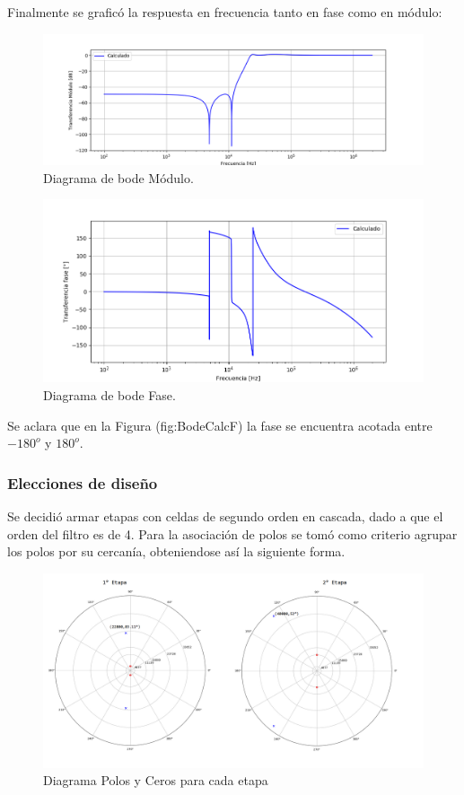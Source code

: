 Finalmente se graficó la respuesta en frecuencia tanto en fase como en módulo:
\begin{figure}[H]
	\centering
	\includegraphics[width=\textwidth]{Imagenes-Ej3/BodeCalc.png}
	\caption{Diagrama de bode Módulo.}
	\label{fig:Bodecalc}
\end{figure}
\begin{figure}[H]
	\centering
	\includegraphics[width=\textwidth]{Imagenes-Ej3/BodeFaseCalc.png}
	\caption{Diagrama de bode Fase.}
	\label{fig:BodeCalcF}
\end{figure}
Se aclara que en la Figura ({fig:BodeCalcF}) la fase se encuentra acotada entre $-180 ^o$ y $180 ^o$. 

\subsubsection{Elecciones de diseño}
Se decidió armar etapas con celdas de segundo orden en cascada, dado a que el orden del filtro es de 4. Para la asociación de polos se tomó como criterio agrupar los polos por su cercanía, obteniendose así la siguiente forma.
\begin{figure}[H]
	\centering
	\includegraphics[width=\textwidth]{Imagenes-Ej3/UnionCeros.png}
	\caption{Diagrama Polos y Ceros para cada etapa}
	\label{fig:CeroPoleUnion}
\end{figure}

